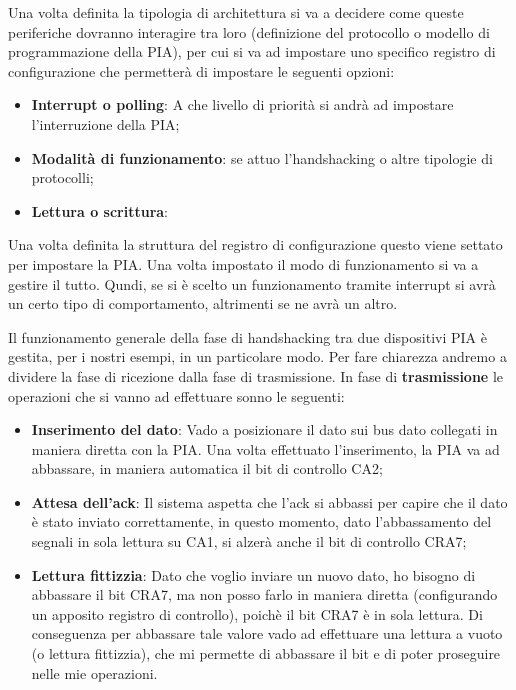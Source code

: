 Una volta definita la tipologia di architettura si va a decidere come queste periferiche dovranno interagire tra loro (definizione del protocollo o modello di programmazione della PIA), per cui si va ad impostare uno specifico registro di configurazione che permetterà di impostare le seguenti opzioni:
\begin{itemize}
    \item \textbf{Interrupt o polling}: A che livello di priorità si andrà ad impostare l'interruzione della PIA;
    \item \textbf{Modalità di funzionamento}: se attuo l'handshacking o altre tipologie di protocolli;
    \item \textbf{Lettura o scrittura}: 

 
\end{itemize}
Una volta definita la struttura del registro di configurazione questo viene settato per impostare la PIA. 
Una volta impostato il modo di funzionamento si va a gestire il tutto. Qundi, se si è scelto un funzionamento tramite interrupt si avrà un certo tipo di comportamento, altrimenti se ne avrà un altro.

Il funzionamento generale della fase di handshacking tra due dispositivi PIA è gestita, per i nostri esempi, in un particolare modo.
Per fare chiarezza andremo a dividere la fase di ricezione dalla fase di trasmissione.
In fase di \textbf{trasmissione} le operazioni che si vanno ad effettuare sonno le seguenti:
\begin{itemize}
    \item \textbf{Inserimento del dato}: Vado a posizionare il dato sui bus dato collegati in maniera diretta con la PIA. Una volta effettuato l'inserimento, la PIA va ad abbassare, in maniera automatica il bit di controllo CA2;
    \item \textbf{Attesa dell'ack}: Il sistema aspetta che l'ack si abbassi per capire che il dato è stato inviato correttamente, in questo momento, dato l'abbassamento del segnali in sola lettura su CA1, si alzerà anche il bit di controllo CRA7;
    \item \textbf{Lettura fittizzia}: Dato che voglio inviare un nuovo dato, ho bisogno di abbassare il bit CRA7, ma non posso farlo in maniera diretta (configurando un apposito registro di controllo), poichè il bit CRA7 è in sola lettura. Di conseguenza per abbassare tale valore vado ad effettuare una lettura a vuoto (o lettura fittizzia), che mi permette di abbassare il bit e di poter proseguire nelle mie operazioni.
\end{itemize}

